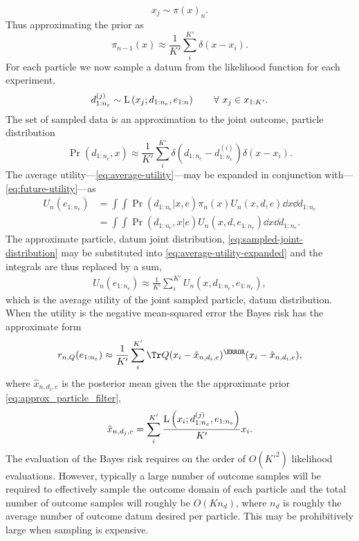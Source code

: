 \documentclass[aps,nofootinbib,twocolumn,superscriptaddress]{revtex4}
\newcommand{\mps}{x}
\newcommand{\eps}{e}
\newcommand{\data}{d}
\begin{document}
\begin{equation}
\mps_j \sim \pi(\mps)_{n}.
\end{equation}
Thus approximating the prior as 
\begin{equation}
\pi_{n-1}(\mps) \approx \frac{1}{K'} \sum \limits_{i}^{K'}\delta \left(\mps-\mps_i\right).
\label{eq:approx_particle_filter}
\end{equation}
For each particle we now sample a datum from the likelihood function for each experiment, 
\begin{equation}
\data_{1:n_e}^{(j)} \sim \Lhood \left(\mps_j;d_{1:n_e},\eps_{1:n}\right)\quad\quad \forall \ \mps_j \in \mps_{1:K'}.
\end{equation}
The set of sampled data is an approximation to the joint outcome, particle distribution 
\begin{equation}
\Pr(\data_{1:n_e},\mps) \approx \frac{1}{K'}\sum \limits_{i}^{K'} \delta \left(\data_{1:n_e}-\data_{1:n_e}^{(i)}\right)\delta\left(\mps-\mps_i\right).
\label{eq:sampled-joint-distribution}
\end{equation}
The average utility---\autoref{eq:average-utility}---may be expanded in conjunction with---\autoref{eq:future-utility}---as 
\begin{align}
    U_n(\eps_{1:n_e})
        &= \int\int \Pr(\data_{1:n_e}|\mps,\eps)\pi_n(\mps)U_n(\mps,\data,\eps)\dd\mps \dd\data_{1:n_e} \nonumber\\
        &= \int\int \Pr(\data_{1:n_e},\mps|\eps)U_n(\mps,\data,\eps_{1:n_e})\dd\mps \dd\data_{1:n_e}.
\label{eq:average-utility-expanded}
\end{align}
The approximate particle, datum joint distribution, \eqref{eq:sampled-joint-distribution} may be substituted into \eqref{eq:average-utility-expanded} and the integrals are thus replaced by a sum, 
\begin{align}
U_n(\eps_{1:n_e}) \approx \frac{1}{K'} \sum \limits_i^{K'} U_n(\mps,\data_{1:n_e},\eps_{1:n_e}),
\end{align}
which is the average utility of the joint sampled particle, datum distribution. When the utility is the negative mean-squared error the Bayes risk has the approximate form 
\begin{align}
    r_{n,Q}(\eps_{1:n_e}) \approx \frac{1}{K'}\sum \limits_i^{K'} \Tr Q(\mps_i - \hat\mps_{n,\data_i,\eps})^\T(\mps_i - \hat\mps_{n,\data_i,\eps}),
    \label{eq:bayes-risk-sampled}
\end{align} 
where $\hat\mps_{n,\data_i,\eps}$ is the posterior mean given the the approximate prior \eqref{eq:approx_particle_filter},
\begin{align}
\hat\mps_{n,\data_j,\eps} = \sum \limits_i^{K'} \frac{\Lhood \left(\mps_i;d_{1:n_e}^{(j)},\eps_{1:n_e}\right)}{K'}\mps_i.
\end{align}
The evaluation of the Bayes risk requires on the order of $O(K'^2)$ likelihood evaluations. However, typically a large number of outcome samples will be required to effectively sample the outcome domain of each particle and the total number of outcome samples will roughly be $O(Kn_d)$, where $n_d$ is roughly the average number of outcome datum desired per particle. This may be prohibitively large when sampling is expensive. 
\end{document}
